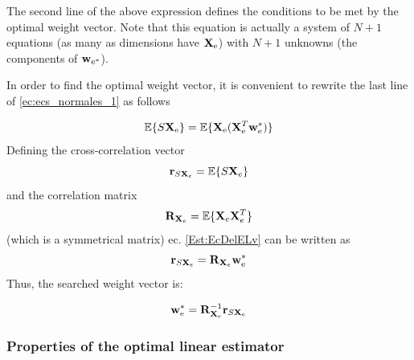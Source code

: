 The second line of the above expression defines the conditions to be met by the optimal weight vector. Note that this equation is actually a system of $N+1$ equations (as many as dimensions have ${\bf X}_{\text{e}}$) with $N+1$ unknowns (the components of ${\bf w}_{\text{e}^*}$).

In order to find the optimal {weight} vector, it is convenient to rewrite the last line of \eqref{ec:ecs_normales_1} as follows 

\begin{equation}
\mathbb{E}\{S {\bf X}_{\text{e}} \}
    = \mathbb{E}\{ {\bf X}_\text{e} ({\bf X}_{\text{e}}^T {\bf w}_{\text{e}}^*)  \}
\label{Est:EcDelELv}
\end{equation}
Defining the cross-correlation vector
\begin{equation}
{\bf r}_{S{\bf X}_e} = \mathbb{E}\{S{\bf X}_e\}
\end{equation}
and the correlation matrix 
\begin{equation}
{{\bf R}_{{\bf X}_e}} = \mathbb{E}\{{\bf X}_e{\bf X}_e^T\}
\end{equation}
(which is a symmetrical matrix) ec. \eqref{Est:EcDelELv} can be written as
\begin{equation}
\label{Est.ec:RxWr}
{\bf r}_{S{\bf X}_e} = {{\bf R}_{{\bf X}_e}} {\bf w}_{\text{e}}^* 
\end{equation}
Thus, the searched weight vector is:
\begin{framed}
\begin{equation}
\label{Est.ec:weopt}
 {\bf w}_{\text{e}}^* = {{\bf R}_{{\bf X}_e}^{-1}} {\bf r}_{S{\bf X}_e} 
\end{equation}
\end{framed}



\subsubsection{Properties of the optimal linear estimator}

